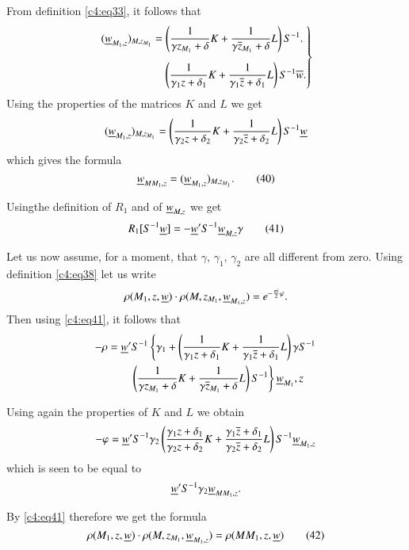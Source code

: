 From definition \eqref{c4:eq33}, it follows that
\begin{equation*}
\left.
\begin{aligned}
(\underline{w}_{M_{1},z})_{M,z_{M_{1}}} &= \left(\frac{1}{\gamma
    z_{M_{1}}+\delta}K+\frac{1}{\gamma
    \overline{z}_{M_{1}}+\delta}L\right)S^{-1}.\\[5pt]
&\quad \left(\frac{1}{\gamma_1 z+\delta_{1}}K+\frac{1}{\gamma_{1}\overline{z}+\delta_{1}}L\right)S^{-1}\overline{w}. 
\end{aligned}
\right\}
\end{equation*}
Using the properties of the matrices $K$ and $L$ we get
$$
(\underline{w}_{M_{1},z})_{M,z_{M_{1}}} = \left(\frac{1}{\gamma_{2}z +
  \delta_{2}} K + \frac{1}{\gamma_{2} \overline{z} + \delta_{2}}L\right) 
S^{-1}\underline{w}  
$$
which gives the formula
\begin{equation*}
\underline{w}_{MM_{1},z}=(\underline{w}_{M_{1},z})_{M,z_{M_{1}}}.\tag{40}\label{c4:eq40}
\end{equation*}

Using\pageoriginale the definition of $R_{1}$ and of $\underline{w}_{M,z}$ we
get
\begin{equation*}
R_{1}[S^{-1}\underline{w}]=-\underline{w}'S^{-1}\underline{w}_{M,z}\gamma\tag{41}\label{c4:eq41}
\end{equation*}

Let us now assume, for a moment, that $\gamma$, $\gamma_{1}$,
$\gamma_{2}$ are all different from zero. Using definition \eqref{c4:eq38}
let us write
$$
\rho(M_{1},z,\underline{w})\cdot
\rho(M,z_{M_{1}},\underline{w}_{M_{1},z})=e^{-\frac{\pi i}{2}\varphi}. 
$$
Then using \eqref{c4:eq41}, it follows that 
\begin{align*}
-\rho&=\underline{w}'S^{-1}\left\{\gamma_{1}+\left(\frac{1}{\gamma_{1} z
+\delta_{1}}  K + \frac{1}{\gamma_{1}\overline{z}+\delta_{1}}L\right)\gamma 
S^{-1}\right.\\
&\qquad\left.\left(\frac{1}{\gamma
  z_{M_{1}}+ \delta}K+\frac{1}{\gamma \overline{z}_{M_1} +
  \delta}L\right)S^{-1}\right\}\underline{w}_{M_{1}},z  
\end{align*}

Using again the properties of $K$ and $L$ we obtain
$$
-\varphi=\underline{w}'S^{-1}\gamma_{2}\left(\frac{\gamma_{1}z+\delta_{1}}{\gamma_{2}z+\delta_{2}}K+\frac{\gamma_{1}\overline{z}+\delta_{1}}{\gamma_{2}\overline{z}+\delta_{2}}L\right)S^{-1}\underline{w}_{M_{1},z} 
$$
which is seen to be equal to
$$
\underline{w}'S^{-1}\gamma_{2}\underline{w}_{MM_{1},z}.
$$

By \eqref{c4:eq41} therefore we get the formula
\begin{equation*}
\rho(M_{1},z,\underline{w})\cdot
\rho(M,z_{M_{1}},\underline{w}_{M_{1},z})=\rho(MM_{1},z,\underline{w})\tag{42}\label{c4:eq42} 
\end{equation*}

